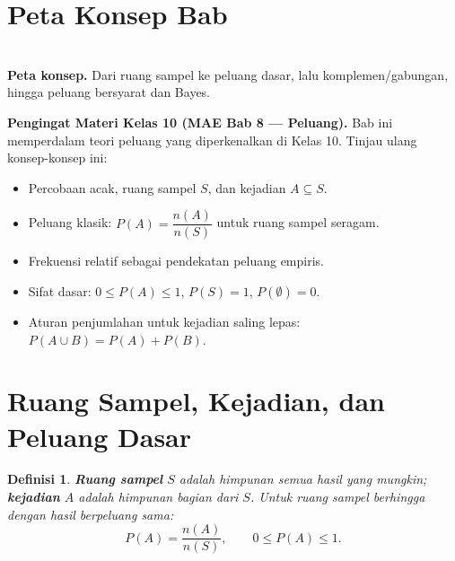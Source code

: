 \documentclass[11pt,a4paper]{report}
\theoremstyle{gaya}
\newtheorem{definisi}{Definisi}[chapter]
\begin{document}
\section*{Peta Konsep Bab}
\begin{center}
\\
\small \textbf{Peta konsep.} Dari ruang sampel ke peluang dasar, lalu komplemen/gabungan, hingga peluang bersyarat dan Bayes.
\end{center}

\begin{catatan}
\textbf{Pengingat Materi Kelas 10 (MAE Bab 8 --- Peluang).} Bab ini memperdalam teori peluang yang diperkenalkan di Kelas 10. Tinjau ulang konsep-konsep ini:
\begin{itemize}[leftmargin=*,topsep=2pt]
  \item Percobaan acak, ruang sampel $S$, dan kejadian $A \subseteq S$.
  \item Peluang klasik: $P(A)=\dfrac{n(A)}{n(S)}$ untuk ruang sampel seragam.
  \item Frekuensi relatif sebagai pendekatan peluang empiris.
  \item Sifat dasar: $0\le P(A)\le1$, $P(S)=1$, $P(\emptyset)=0$.
  \item Aturan penjumlahan untuk kejadian saling lepas: $P(A\cup B)=P(A)+P(B)$.
\end{itemize}
\end{catatan}

\section{Ruang Sampel, Kejadian, dan Peluang Dasar}
\begin{definisi}
\textbf{Ruang sampel} $S$ adalah himpunan semua hasil yang mungkin; \textbf{kejadian} $A$ adalah himpunan bagian dari $S$. Untuk ruang sampel berhingga dengan hasil berpeluang sama:
\[
P(A)=\frac{n(A)}{n(S)},\qquad 0\le P(A)\le1.
\]
\end{definisi}
\end{document}
